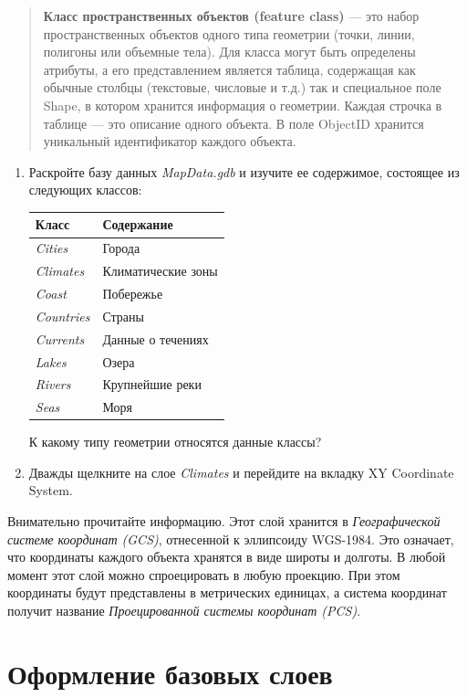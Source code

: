 \documentclass[12pt,]{book}
\begin{document}
\begin{quote}
\textbf{Класс пространственных объектов (feature class)} --- это набор
пространственных объектов одного типа геометрии (точки, линии, полигоны
или объемные тела). Для класса могут быть определены атрибуты, а его
представлением является таблица, содержащая как обычные столбцы
(текстовые, числовые и т.д.) так и специальное поле Shape, в котором
хранится информация о геометрии. Каждая строчка в таблице --- это описание
одного объекта. В поле ObjectID хранится уникальный идентификатор каждого объекта.
\end{quote}

\begin{enumerate}
\def\labelenumi{\arabic{enumi}.}
\setcounter{enumi}{2}
\item
  Раскройте базу данных \emph{MapData.gdb} и изучите ее содержимое, состоящее из следующих классов:

  \begin{longtable}[]{@{}ll@{}}
  \toprule
  \textbf{Класс} & \textbf{Содержание}\tabularnewline
  \midrule
  \endhead
  \emph{Cities} & Города\tabularnewline
  \emph{Climates} & Климатические зоны\tabularnewline
  \emph{Coast} & Побережье\tabularnewline
  \emph{Countries} & Страны\tabularnewline
  \emph{Currents} & Данные о течениях\tabularnewline
  \emph{Lakes} & Озера\tabularnewline
  \emph{Rivers} & Крупнейшие реки\tabularnewline
  \emph{Seas} & Моря\tabularnewline
  \bottomrule
  \end{longtable}

  К какому типу геометрии относятся данные классы?
\item
  Дважды щелкните на слое \emph{Climates} и перейдите на вкладку XY Coordinate System.
\end{enumerate}

Внимательно прочитайте информацию. Этот слой хранится в \emph{Географической
системе координат (GCS)}, отнесенной к эллипсоиду WGS-1984. Это
означает, что координаты каждого объекта хранятся в виде широты и
долготы. В любой момент этот слой можно спроецировать в любую проекцию.
При этом координаты будут представлены в метрических единицах, а система
координат получит название \emph{Проецированной системы координат (PCS)}.

\hypertarget{map-design-climates-basic}{%
\section{Оформление базовых слоев}\label{map-design-climates-basic}}
\end{document}
